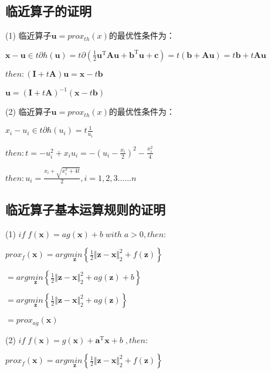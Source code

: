 \documentclass[12pt, a4paper, oneside, fontset=windows]{ctexart}
\begin{document}
\subsection{临近算子的证明}
(1)
临近算子$\mathbf u=prox_{th}\left ( x \right )$的最优性条件为：

$\mathbf x-\mathbf u\in t\partial h\left ( \mathbf{u}\right ) 
=t\partial\left ( \frac{1}{2} \mathbf{u}^\mathrm{T} \mathbf A\mathbf{u}+\mathbf{b}^\mathrm{T}\mathbf{u}+\mathbf c\right )
=t\left (\mathbf{b}+\mathbf{A}\mathbf{u} \right )
=t\mathbf{b}+t\mathbf{A}\mathbf{u}$

$then: \left ( \mathbf{I}+t \mathbf{A}\right ) \mathbf{u}=\mathbf{x}-t\mathbf{b}$

$\mathbf{u}=\left (\mathbf{I}+t \mathbf{A} \right )^\mathrm{-1}\left ( \mathbf{x}-t\mathbf{b} \right )$

(2)
临近算子$\mathbf u=prox_{th}\left ( x \right )$的最优性条件为：

$x_{i}- u_{i}\in t\partial h\left ({u_{i}}\right ) 
=t\frac{1}{u_{i}}$

$then:t=- u_{i}^{2}+x_{i}u_{i}=-\left ( u_{i}-\frac{x_{i}}{2} \right )^{2}-\frac{x_{i}^{2}}{4}$

$then:u_{i}=\frac{x_{i}+\sqrt{x_{i}^{2}+4t}}{2},i=1,2,3......n$


\subsection{临近算子基本运算规则的证明}
(1)
$if \; f\left (\mathbf  x \right )=ag\left (\mathbf  x \right )+b\; with\; a> 0,then:$

$prox_{f}\left ( \mathbf x \right )=arg\underset{\mathbf z}{min}\left \{ \frac{1}{2}\Vert \mathbf z - \mathbf x \Vert _2^{2}+f \left (\mathbf z \right )\right \}$

$=arg\underset{\mathbf z}{min}\left \{ \frac{1}{2}\Vert \mathbf z - \mathbf x \Vert _2^{2}+ag\left (\mathbf  z \right )+b\right \}$

$=arg\underset{\mathbf z}{min}\left \{ \frac{1}{2}\Vert \mathbf z - \mathbf x \Vert _2^{2}+ag\left (\mathbf  z \right )\right \}$

$=prox_{ag}\left ( \mathbf x \right )$

(2)
$if \; f\left (\mathbf  x \right )=g\left (\mathbf  x \right )+\mathbf a ^\mathrm{T}\mathbf  x + b\; ,then:$

$prox_{f}\left ( \mathbf x \right )=arg\underset{\mathbf z}{min}\left \{ \frac{1}{2}\Vert \mathbf z - \mathbf x \Vert _2^{2}+f \left (\mathbf z \right )\right \}$
\end{document}
